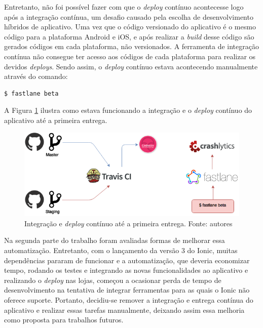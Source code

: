 Entretanto, não foi possível fazer com que o \textit{deploy} contínuo acontecesse logo após a integração contínua, um desafio causado pela escolha de desenvolvimento híbridos de aplicativo. Uma vez que o código versionado do aplicativo é o mesmo código para a plataforma Android e iOS, e após realizar a \textit{build} desse código são gerados códigos em cada plataforma, não versionados. A ferramenta de integração contínua não consegue ter acesso aos códigos de cada plataforma para realizar os devidos \textit{deploys}. Sendo assim, o \textit{deploy} contínuo estava acontecendo manualmente através do comando:

\begin{lstlisting}[language=bash]
  $ fastlane beta
\end{lstlisting}

A Figura \ref{img:integracao_deploy_continuo_atual} ilustra como estava funcionando a integração e o \textit{deploy} contínuo do aplicativo até a primeira entrega.

\begin{figure}[H]
    \centering
    \includegraphics[scale=0.5]{figuras/ci_currently.png}
    \caption[Integração e \textit{deploy} contínuo atual]{Integração e \textit{deploy} contínuo até a primeira entrega. Fonte: autores}
    \label{img:integracao_deploy_continuo_atual}
\end{figure}

Na segunda parte do trabalho foram avaliadas formas de melhorar essa automatização. Entretanto, com o lançamento da versão 3 do Ionic, muitas dependências pararam de funcionar e a automatização, que deveria economizar tempo, rodando os testes e integrando as novas funcionalidades ao aplicativo e realizando o \textit{deploy} nas lojas, começou a ocasionar perda de tempo de desenvolvimento na tentativa de integrar ferramentas para as quais o Ionic não oferece suporte. Portanto, decidiu-se remover a integração e entrega contínua do aplicativo e realizar essas tarefas manualmente, deixando assim essa melhoria como proposta para trabalhos futuros.

